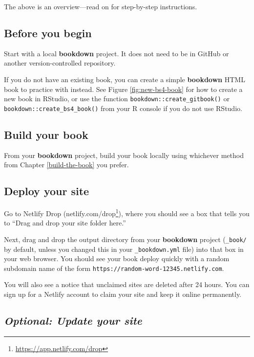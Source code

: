 \documentclass[
  12pt,
]{krantz}
\renewcommand{\href}[2]{#2\footnote{\url{#1}}}
\theoremstyle{definition}
\theoremstyle{definition}
\theoremstyle{definition}
\theoremstyle{definition}
\theoremstyle{remark}
\begin{document}
The above is an overview---read on for step-by-step instructions.

\subsection{Before you begin}\label{before-you-begin}

Start with a local \textbf{bookdown} project. It does not need to be in GitHub or another version-controlled repository.

If you do not have an existing book, you can create a simple \textbf{bookdown} HTML book to practice with instead. See Figure \ref{fig:new-bs4-book} for how to create a new book in RStudio, or use the function \texttt{bookdown::create\_gitbook()} or \texttt{bookdown::create\_bs4\_book()} from your R console if you do not use RStudio.

\subsection{Build your book}\label{build-your-book}

From your \textbf{bookdown} project, build your book locally using whichever method from Chapter \ref{build-the-book} you prefer.

\subsection{Deploy your site}\label{deploy-your-site}

Go to Netlify Drop (\href{https://app.netlify.com/drop}{netlify.com/drop}), where you should see a box that tells you to ``Drag and drop your site folder here.''

Next, drag and drop the output directory from your \textbf{bookdown} project (\texttt{\_book/} by default, unless you changed this in your \texttt{\_bookdown.yml} file) into that box in your web browser. You should see your book deploy quickly with a random subdomain name of the form \texttt{https://random-word-12345.netlify.com}.

You will also see a notice that unclaimed sites are deleted after 24 hours. You can sign up for a Netlify account to claim your site and keep it online permanently.

\subsection{\texorpdfstring{\emph{Optional: Update your site}}{Optional: Update your site}}\label{optional-update-your-site}
\end{document}

